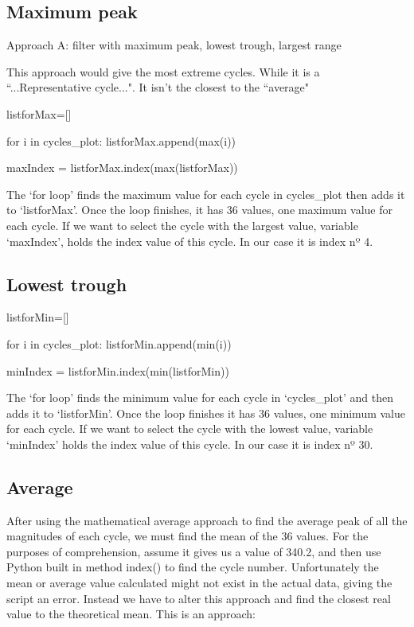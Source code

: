 \subsection{Maximum peak}
Approach A: filter with maximum peak, lowest trough, largest range 

This approach would give the most extreme cycles. While it is a ``...Representative cycle...". It isn't the closest to the ``average"

\begin{python}
listforMax=[]

for i in cycles_plot:
    listforMax.append(max(i))    
    
maxIndex = listforMax.index(max(listforMax))

\end{python}

The `for loop' finds the maximum value for each cycle in cycles\_plot then adds it to `listforMax'. Once the loop finishes, it has 36 values, one maximum value for each cycle. If we want to select the cycle with the largest value, variable `maxIndex', holds the index value of this cycle. In our case it is index nº 4.

\subsection{Lowest trough}

\begin{python}
listforMin=[]

for i in cycles_plot:
    listforMin.append(min(i))
    
minIndex = listforMin.index(min(listforMin))

\end{python}

The `for loop' finds the minimum value for each cycle in `cycles\_plot' and then adds it to `listforMin'. Once the loop finishes it has 36 values, one minimum value for each cycle. If we want to select the cycle with the lowest value, variable `minIndex' holds the index value of this cycle. In our case it is index nº 30.

\subsection{Average}
After using the mathematical average approach to find the average peak of all the magnitudes of each cycle, we must find the mean of the 36 values. For the purposes of comprehension, assume it gives us a value of 340.2, and then use Python built in method index() to find the cycle number. Unfortunately the mean or average value calculated might not exist in the actual data, giving the script an error. Instead we have to alter this approach and find the closest real value to the theoretical mean. This is an approach: 

